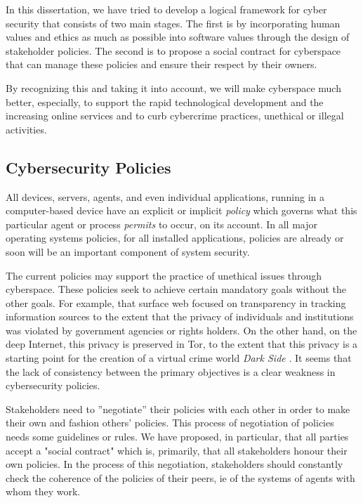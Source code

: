 In this dissertation, we have tried to develop a logical framework for cyber security that consists of two main stages. The first is by incorporating  human values and ethics as much as possible into software values through the design of stakeholder policies. The second is to propose a social contract for cyberspace that can manage these policies and ensure their respect by their owners.

By recognizing this and taking it into account, we will make cyberspace much better, especially,  to support the rapid technological development and the increasing online services and to curb cybercrime practices, unethical or illegal activities.

\subsection{Cybersecurity Policies}
All devices, servers, agents, and even individual applications, running in a computer-based device have an explicit or implicit {\em policy} which governs what this particular agent or process {\em permits} to occur, on its account. In all major operating systems policies, for all installed applications, policies are already or soon will be an important component of system security.

The current policies may support the practice 
of unethical issues through cyberspace.
 These policies seek to achieve certain mandatory goals without the other goals.
For example,  that surface web focused on transparency
in tracking information sources to the extent that the privacy of
individuals and institutions was violated by government agencies or
rights holders. On the other hand, on the deep Internet, this privacy
is preserved in Tor, to the extent that this
privacy is a starting point for the creation of a virtual crime world
\emph{Dark Side} \cite{gupta2021dark,kavallieros2021understanding}. It seems that the lack of consistency between the
primary objectives is a clear weakness in cybersecurity policies.

Stakeholders need to ''negotiate'' their policies with each other in
order to make their own and fashion others' policies. This process of
negotiation of policies needs some guidelines or rules. We have proposed,
in particular, that all parties accept a "social contract" which is,
primarily, that all stakeholders honour their own policies. In the
process of this negotiation, stakeholders should constantly check the
coherence of the policies of their peers, ie of the systems of agents
with whom they work.

